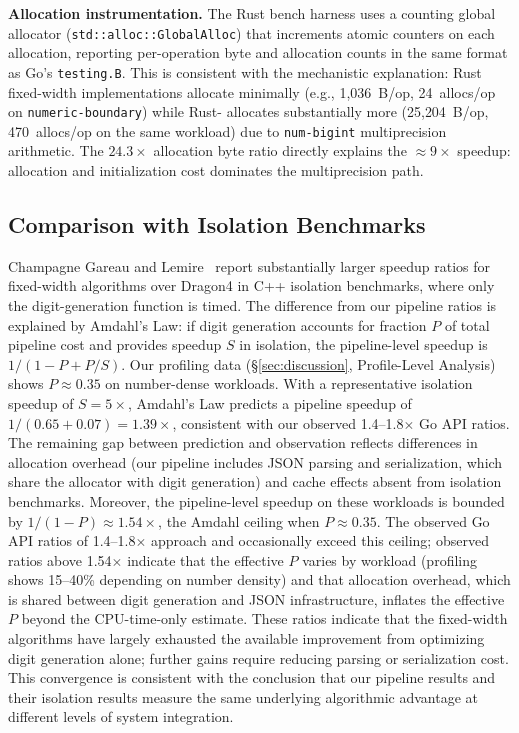 \textbf{Allocation instrumentation.}  The Rust bench harness uses a
counting global allocator (\texttt{std::alloc::GlobalAlloc}) that
increments atomic counters on each allocation, reporting per-operation
byte and allocation counts in the same format as Go's
\texttt{testing.B}.  This is consistent with the mechanistic explanation:
Rust fixed-width implementations allocate minimally (e.g., 1{,}036~B/op,
24~allocs/op on \texttt{numeric-boundary}) while Rust-\burgerdybvig
allocates substantially more (25{,}204~B/op, 470~allocs/op on the same
workload) due to \texttt{num-bigint} multiprecision arithmetic.  The
$24.3\times$ allocation byte ratio directly explains the
${\approx}9\times$ speedup: allocation and initialization cost dominates
the multiprecision path.

\subsection{Comparison with Isolation Benchmarks}

Champagne Gareau and Lemire~\cite{champagnegareau2026} report
substantially larger speedup ratios for fixed-width algorithms over
Dragon4 in C++ isolation benchmarks, where only the digit-generation
function is timed.  The difference from our pipeline ratios is
explained by Amdahl's Law: if digit generation accounts for fraction
$P$ of total pipeline cost and provides speedup $S$ in isolation,
the pipeline-level speedup is $1/(1 - P + P/S)$.  Our profiling data
(\S\ref{sec:discussion}, Profile-Level Analysis) shows $P \approx 0.35$
on number-dense workloads.  With a representative isolation speedup of
$S = 5\times$, Amdahl's Law predicts a pipeline speedup of
$1/(0.65 + 0.07) = 1.39\times$, consistent with our observed
1.4--1.8$\times$ Go API ratios.  The remaining gap between prediction
and observation reflects differences in allocation overhead (our
pipeline includes JSON parsing and serialization, which share the
allocator with digit generation) and cache effects absent from
isolation benchmarks.  Moreover, the pipeline-level speedup on these
workloads is bounded by $1/(1-P) \approx 1.54\times$, the Amdahl
ceiling when $P \approx 0.35$.  The observed Go API ratios of
1.4--1.8$\times$ approach and occasionally exceed this ceiling;
observed ratios above 1.54$\times$ indicate that the effective $P$
varies by workload (profiling shows 15--40\% depending on number
density) and that allocation overhead, which is shared between digit
generation and JSON infrastructure, inflates the effective $P$ beyond
the CPU-time-only estimate.  These ratios indicate that the
fixed-width algorithms have largely exhausted the available improvement
from optimizing digit generation alone; further gains require reducing
parsing or serialization cost.  This convergence is consistent with the conclusion that our
pipeline results and their isolation results measure the same underlying
algorithmic advantage at different levels of system integration.

